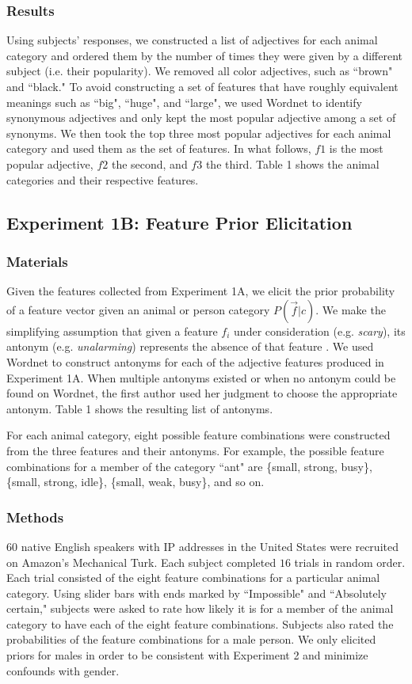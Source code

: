 \documentclass[10pt,letterpaper]{article}
\begin{document}
\subsubsection{Results}
Using subjects' responses, we constructed a list of adjectives for each animal category and ordered them by the number of times they were given by a different subject (i.e. their popularity). We removed all color adjectives, such as ``brown" and ``black." To avoid constructing a set of features that have roughly equivalent meanings such as ``big", ``huge", and ``large", we used Wordnet \cite{Miller95wordnet:a} to identify synonymous adjectives and only kept the most popular adjective among a set of synonyms. We then took the top three most popular adjectives for each animal category and used them as the set of features. In what follows, $f1$ is the most popular adjective, $f2$ the second, and $f3$ the third. Table 1 shows the animal categories and their respective features.

\subsection{Experiment 1B: Feature Prior Elicitation}
\subsubsection{Materials}
Given the features collected from Experiment 1A, we elicit the prior probability of a feature vector given an animal or person category $P(\vec f | c)$. We make the simplifying assumption that given a feature $f_i$ under consideration (e.g. \emph{scary}), its antonym (e.g. \emph{unalarming}) represents the absence of that feature . We used Wordnet to construct antonyms for each of the adjective features produced in Experiment 1A. When multiple antonyms existed or when no antonym could be found on Wordnet, the first author used her judgment to choose the appropriate antonym. Table 1 shows the resulting list of antonyms. 

For each animal category, eight possible feature combinations were constructed from the three features and their antonyms. For example, the possible feature combinations for a member of the category ``ant" are \{small, strong, busy\}, \{small, strong, idle\}, \{small, weak, busy\}, and so on.

\subsubsection{Methods}
$60$ native English speakers with IP addresses in the United States were recruited on Amazon's Mechanical Turk. Each subject completed $16$ trials in random order. Each trial consisted of the eight feature combinations for a particular animal category. Using slider bars with ends marked by ``Impossible" and ``Absolutely certain," subjects were asked to rate how likely it is for a member of the animal category to have each of the eight feature combinations. Subjects also rated the probabilities of the feature combinations for a male person. We only elicited priors for males in order to be consistent with Experiment 2 and minimize confounds with gender.
\end{document}
